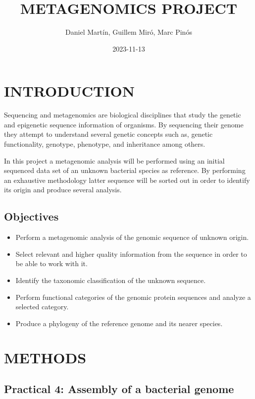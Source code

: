 \documentclass[
]{article}
\title{METAGENOMICS PROJECT}
\author{Daniel Martín, Guillem Miró, Marc Pinós}
\date{2023-11-13}
\providecommand{\tightlist}{%
  \setlength{\itemsep}{0pt}\setlength{\parskip}{0pt}}
\begin{document}
\maketitle

\hypertarget{introduction}{%
\section{INTRODUCTION}\label{introduction}}

Sequencing and metagenomics are biological disciplines that study the
genetic and epigenetic sequence information of organisms. By sequencing
their genome they attempt to understand several genetic concepts such
as, genetic functionality, genotype, phenotype, and inheritance among
others.

In this project a metagenomic analysis will be performed using an
initial sequenced data set of an unknown bacterial species as reference.
By performing an exhaustive methodology latter sequence will be sorted
out in order to identify its origin and produce several analysis.

\hypertarget{objectives}{%
\subsection{Objectives}\label{objectives}}

\begin{itemize}
\tightlist
\item
  Perform a metagenomic analysis of the genomic sequence of unknown
  origin.
\item
  Select relevant and higher quality information from the sequence in
  order to be able to work with it.
\item
  Identify the taxonomic classification of the unknown sequence.
\item
  Perform functional categories of the genomic protein sequences and
  analyze a selected category.
\item
  Produce a phylogeny of the reference genome and its nearer species.
\end{itemize}

\hypertarget{methods}{%
\section{METHODS}\label{methods}}

\hypertarget{practical-4-assembly-of-a-bacterial-genome}{%
\subsection{Practical 4: Assembly of a bacterial
genome}\label{practical-4-assembly-of-a-bacterial-genome}}
\end{document}
